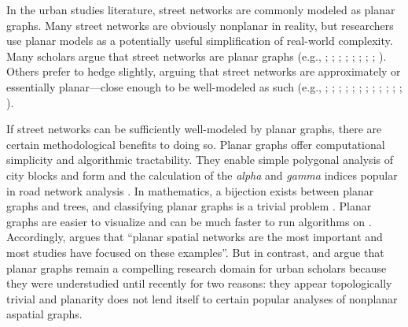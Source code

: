 \documentclass[Afour,doublespace,sageh,times]{sagej}
\begin{document}
In the urban studies literature, street networks are commonly modeled as planar graphs. Many street networks are obviously nonplanar in reality, but researchers use planar models as a potentially useful simplification of real-world complexity. Many scholars argue that street networks are planar graphs (e.g., \citealp[p.~18]{batty_network_2005}; \citealp[p.~521]{buhl_topological_2006}; \citealp[p.~1]{hu_topological_2008}; \citealp[p.~259]{masucci_random_2009}; \citealp[p.~114]{porta_networks_2010}; \citealp[p.~3]{strano_elementary_2012}; \citealp[p.~1]{masucci_limited_2013}; \citealp[p.~1074]{strano_urban_2013}; \citealp[p.~168]{law_defining_2017}). Others prefer to hedge slightly, arguing that street networks are approximately or essentially planar---close enough to be well-modeled as such (e.g., \citealp[p.~6]{dill_measuring_2004}; \citealp[p.~3]{cardillo_structural_2006};  \citealp[p.~340]{xie_measuring_2007}; \citealp[p.~1]{barthelemy_modeling_2008}; \citealp[p.~3]{barthelemy_spatial_2011}; \citealp[pp.~563]{chan_urban_2011}; \citealp[p.~1]{gudmundsson_entropy_2013}; \citealp[p.~1]{viana_simplicity_2013}; \citealp[p.~2]{louf_typology_2014}; \citealp[p.~2191]{zhong_detecting_2014}; \citealp[p.~2]{wang_resilience_2015}; \citealp[p.~42]{aldous_routed_2016}; \citealp[p.~257]{barthelemy_paths_2017}).

If street networks can be sufficiently well-modeled by planar graphs, there are certain methodological benefits to doing so. Planar graphs offer computational simplicity and algorithmic tractability. They enable simple polygonal analysis of city blocks and form \citep{fohl_non-planar_1996,barthelemy_paths_2017} and the calculation of the \emph{alpha} and \emph{gamma} indices popular in road network analysis \citep{eppstein_studying_2008}. In mathematics, a bijection exists between planar graphs and trees, and classifying planar graphs is a trivial problem \citep{louf_typology_2014}. Planar graphs are easier to visualize and can be much faster to run algorithms on \citep{liebers_planarizing_2001}. Accordingly, \citet[p.~3]{barthelemy_spatial_2011} argues that \enquote{planar spatial networks are the most important and most studies have focused on these examples}. But in contrast, \citet{masucci_random_2009} and \citet{masucci_limited_2013} argue that planar graphs remain a compelling research domain for urban scholars because they were understudied until recently for two reasons: they appear topologically trivial and planarity does not lend itself to certain popular analyses of nonplanar aspatial graphs.
\end{document}

